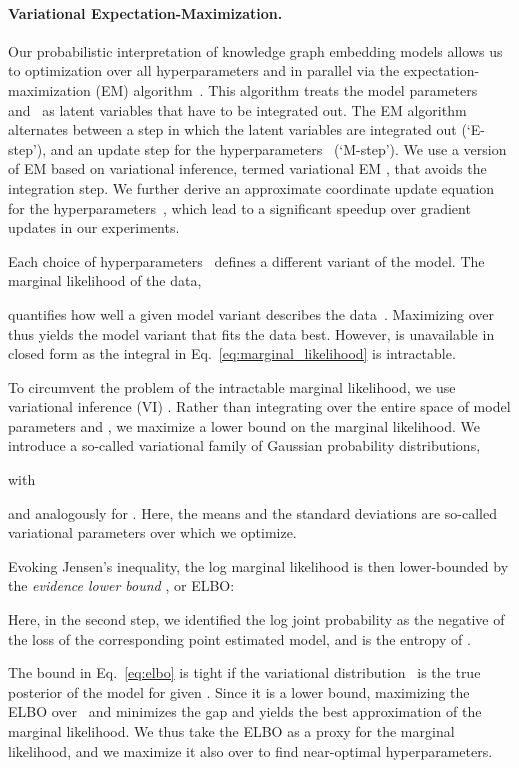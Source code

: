 \documentclass[letterpage]{article}
\begin{document}
\paragraph{Variational Expectation-Maximization.}
Our probabilistic interpretation of knowledge graph embedding models allows us to optimization over all hyperparameters  and  in parallel via the expectation-maximization (EM) algorithm~\citep{dempster1977maximum}.
This algorithm treats the model parameters~ and~ as latent variables that have to be integrated out.
The EM algorithm alternates between a step in which the latent variables are integrated out (`E-step'), and an update step for the hyperparameters~ (`M-step').
We use a version of EM based on variational inference, termed variational EM \citep{bernardo2003variational}, that avoids the integration step.
We further derive an approximate coordinate update equation for the hyperparameters~, which lead to a significant speedup over gradient updates in our experiments.

Each choice of hyperparameters~ defines a different variant of the model.
The marginal likelihood of the data,

quantifies how well a given model variant describes the data~.
Maximizing  over  thus yields the model variant that fits the data best.
However,  is unavailable in closed form as the integral in Eq.~\ref{eq:marginal_likelihood} is intractable.

To circumvent the problem of the intractable marginal likelihood, we use variational inference (VI) \citep{JGJS1999}.
Rather than integrating over the entire space of model parameters  and , we maximize a lower bound on the marginal likelihood.
We introduce a so-called variational family of Gaussian probability distributions,

with

and analogously for .
Here, the means  and the standard deviations  are so-called variational parameters over which we optimize.

Evoking Jensen's inequality, the log marginal likelihood is then lower-bounded by the \emph{evidence lower bound} \citep{BKM2017,ZBKM2017}, or ELBO:

Here, in the second step, we identified the log joint probability as the negative of the loss  of the corresponding point estimated model, and  is the entropy of .


The bound in Eq.~\ref{eq:elbo} is tight if the variational distribution~ is the true posterior of the model for given .
Since it is a lower bound, maximizing the ELBO over~ and  minimizes the gap and yields the best approximation of the marginal likelihood.
We thus take the ELBO as a proxy for the marginal likelihood, and we maximize it also over  to find near-optimal hyperparameters.
\end{document}
